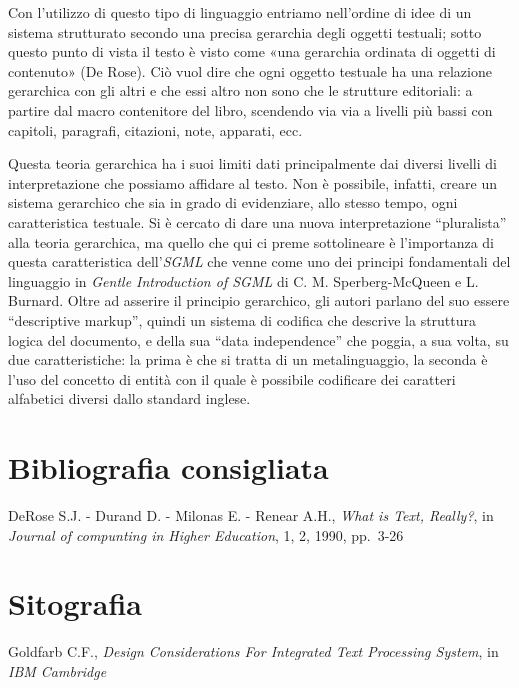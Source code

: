 \documentclass[
  b5paper,
  twoside,
  12pt,
  chapterprefix=false,
  bibliography=totocnumbered,
  parskip=false]{scrbook}
\begin{document}
Con l'utilizzo di questo tipo di linguaggio entriamo nell'ordine di idee
di un sistema strutturato secondo una precisa gerarchia degli oggetti
testuali; sotto questo punto di vista il testo è visto come «una
gerarchia ordinata di oggetti di contenuto» (De Rose). Ciò vuol dire che
ogni oggetto testuale ha una relazione gerarchica con gli altri e che
essi altro non sono che le strutture editoriali: a partire dal macro
contenitore del libro, scendendo via via a livelli più bassi con
capitoli, paragrafi, citazioni, note, apparati, ecc.

Questa teoria gerarchica ha i suoi limiti dati principalmente dai
diversi livelli di interpretazione che possiamo affidare al testo. Non è
possibile, infatti, creare un sistema gerarchico che sia in grado di
evidenziare, allo stesso tempo, ogni caratteristica testuale. Si è
cercato di dare una nuova interpretazione \enquote{pluralista} alla teoria
gerarchica, ma quello che qui ci preme sottolineare è l'importanza di
questa caratteristica dell'\emph{SGML} che venne come uno dei principi
fondamentali del linguaggio in \emph{Gentle Introduction of SGML} di C. M.
Sperberg-McQueen e L. Burnard. Oltre ad asserire il principio
gerarchico, gli autori parlano del suo essere \enquote{descriptive markup},
quindi un sistema di codifica che descrive la struttura logica del
documento, e della sua \enquote{data independence} che poggia, a sua volta, su
due caratteristiche: la prima è che si tratta di un metalinguaggio, la
seconda è l'uso del concetto di entità con il quale è possibile
codificare dei caratteri alfabetici diversi dallo standard inglese.

\hypertarget{bibliografia-consigliata-23}{%
\section*{Bibliografia consigliata}\label{bibliografia-consigliata-23}}

DeRose S.J. - Durand D. - Milonas E. - Renear A.H., \emph{What is Text,
Really?}, in \emph{Journal of compunting in Higher Education}, 1, 2, 1990,
pp.~3-26

\hypertarget{sitografia-29}{%
\section*{Sitografia}\label{sitografia-29}}

Goldfarb C.F., \emph{Design Considerations For Integrated Text Processing
System}, in \emph{IBM Cambridge}
\end{document}
